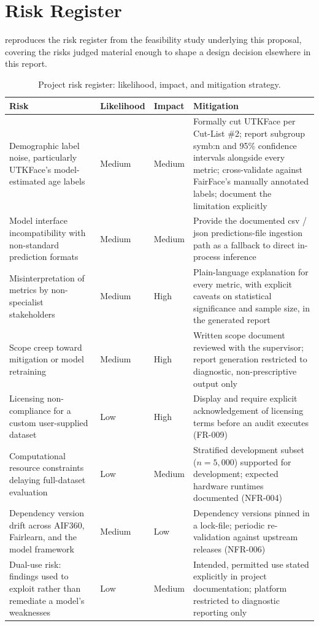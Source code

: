 \chapter{Risk Register}%
\label{app:riskregister}

 reproduces the risk register from the feasibility study underlying this proposal, covering the risks judged material enough to shape a design decision elsewhere in this report.

\begin{table}[htbp]
    \centering
    \renewcommand{\arraystretch}{1.3}
    \caption{Project risk register: likelihood, impact, and mitigation strategy.}%
    \label{tab:riskregister}
    \begin{tabular}{p{3cm}p{1.9cm}p{1.6cm}p{6.5cm}}
        \toprule
        \textbf{Risk} & \textbf{Likelihood} & \textbf{Impact} & \textbf{Mitigation} \\
        \midrule
        Demographic label noise, particularly UTKFace's model-estimated age labels & Medium & Medium & Formally cut UTKFace per Cut-List \#2; report subgroup \gls{symb:n} and 95\% confidence intervals alongside every metric; cross-validate against FairFace's manually annotated labels; document the limitation explicitly \\
        Model interface incompatibility with non-standard prediction formats & Medium & Medium & Provide the documented \gls{csv} / \gls{json} predictions-file ingestion path as a fallback to direct in-process inference \\
        Misinterpretation of metrics by non-specialist stakeholders & Medium & High & Plain-language explanation for every metric, with explicit caveats on statistical significance and sample size, in the generated report \\
        Scope creep toward mitigation or model retraining & Medium & High & Written scope document reviewed with the supervisor; report generation restricted to diagnostic, non-prescriptive output only \\
        Licensing non-compliance for a custom user-supplied dataset & Low & High & Display and require explicit acknowledgement of licensing terms before an audit executes (FR-009) \\
        Computational resource constraints delaying full-dataset evaluation & Low & Medium & Stratified development subset ($n=5{,}000$) supported for development; expected hardware runtimes documented (NFR-004) \\
        Dependency version drift across AIF360, Fairlearn, and the model framework & Medium & Low & Dependency versions pinned in a lock-file; periodic re-validation against upstream releases (NFR-006) \\
        Dual-use risk: findings used to exploit rather than remediate a model's weaknesses & Low & Medium & Intended, permitted use stated explicitly in project documentation; platform restricted to diagnostic reporting only \\
        \bottomrule
    \end{tabular}
\end{table}
